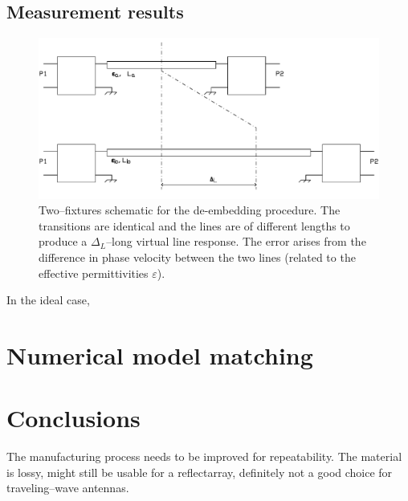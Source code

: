 \documentclass[11pt,a4paper]{article}
\begin{document}
    \subsection{Measurement results}
    \label{subsec:measure-error}
    \begin{figure}[!tb]
        \includegraphics[width=\textwidth]{error}
        \caption{Two--fixtures schematic for the de-embedding procedure. The transitions are identical and the lines are
        of different lengths to produce a $\Delta_L$--long virtual line response. The error arises from the difference
        in phase velocity between the two lines (related to the effective permittivities $\varepsilon$).}
        \label{fig:error}
    \end{figure}
    In the ideal case,


    \section{Numerical model matching}
    \label{sec:numerical-model-matching}


    \section{Conclusions}
    \label{sec:conclusion}
    The manufacturing process needs to be improved for repeatability.
    The material is lossy, might still be usable for a reflectarray, definitely not a good choice for traveling--wave antennas.

    \clearpage
    
    
\end{document}
